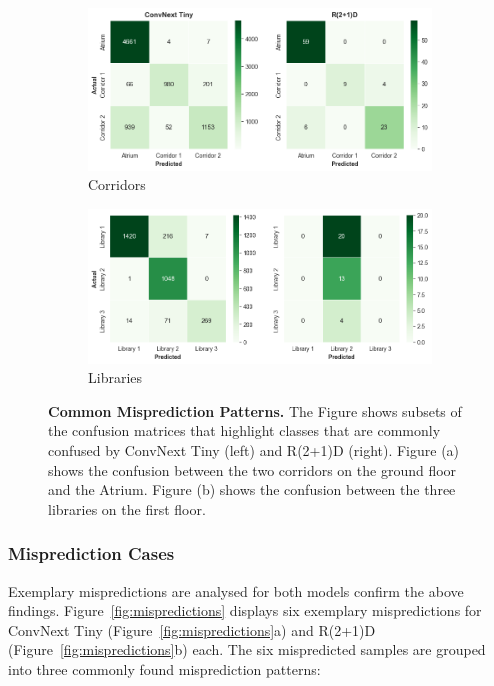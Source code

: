 \documentclass[a4paper]{article}
\begin{document}
\begin{figure}
  \centering
  \begin{subfigure}[b]{\textwidth}
    \includegraphics[width=\textwidth]{./figures/conf-matrix-corridors.png}
    \caption{Corridors}
  \end{subfigure}
  \vspace{.5cm}
  \begin{subfigure}[b]{\textwidth}
    \includegraphics[width=\textwidth]{./figures/conf-matrix-libraries.png}
    \caption{Libraries}
  \end{subfigure}
  \caption{
    \textbf{Common Misprediction Patterns.} The Figure shows subsets of the
    confusion matrices that highlight classes that are commonly confused by
    ConvNext Tiny (left) and R(2+1)D (right). Figure (a) shows the confusion
    between the two corridors on the ground floor and the Atrium. Figure (b)
    shows the confusion between the three libraries on the first floor. 
  }
  \label{fig:conf-matrix-challenging}
\end{figure}

\subsubsection{Misprediction Cases} %
\label{sub:mispredictions}

Exemplary mispredictions are analysed for both models confirm the above
findings. Figure~\ref{fig:mispredictions} displays six exemplary mispredictions
for ConvNext Tiny (Figure~\ref{fig:mispredictions}a) and R(2+1)D
(Figure~\ref{fig:mispredictions}b) each. The six mispredicted samples are
grouped into three commonly found misprediction patterns:
\end{document}
